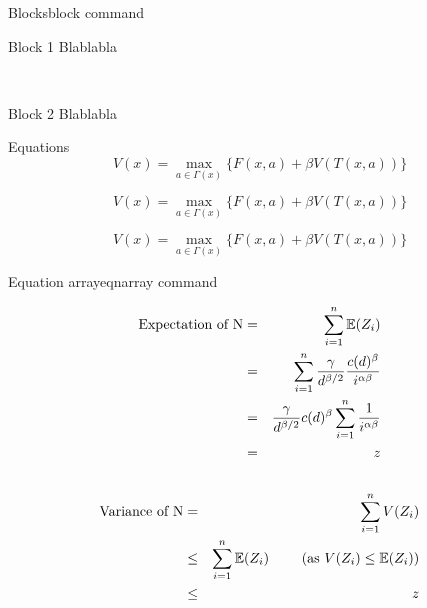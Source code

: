 \begin{frame}{Blocks}{block command}
    \begin{block}{Block 1}
        Blablabla
    \end{block}

    ~\\

    \begin{block}{Block 2}
        Blablabla
    \end{block}
\end{frame}
\note{
}


\begin{frame}{Equations}
    $$
        V(x) = \max_{a \in \Gamma (x) } \{ F(x,a) + \beta V(T(x,a)) \}  \label{eq:bellman}
    $$

    \[
        V(x) = \max_{a \in \Gamma (x) } \{ F(x,a) + \beta V(T(x,a)) \}  \label{eq:bellman}
    \]

    \begin{equation}
        V(x) = \max_{a \in \Gamma (x) } \{ F(x,a) + \beta V(T(x,a)) \}  \label{eq:bellman}
    \end{equation}
\end{frame}
\note{
}



\begin{frame}{Equation array}{eqnarray command}
    \begin{tiny}
        \begin{eqnarray*}
            \mbox{Expectation of N} & = & \sum_{i=1}^{n} \mathbb{E}(Z_i) \\
                                    & = & \sum_{i=1}^{n} \frac{\gamma}{d^{\beta/2}} \frac{ c(d)^\beta }{i^{\alpha\beta}} \\
                                    & = & \frac{\gamma}{d^{\beta/2}} c(d)^\beta \sum_{i=1}^{n} \frac{1}{i^{\alpha\beta}} \\
                                    & = & z \\
                                    & ~ & \\
        \end{eqnarray*}
        \begin{eqnarray}
            \mbox{Variance of N} & = & \sum_{i=1}^{n} V(Z_i) \\
                                 & \leq & \sum_{i=1}^{n} \mathbb{E}(Z_i) ~~~~~~~ (\mbox{as } V(Z_i) \leq \mathbb{E}(Z_i)) \\
                                 & \leq & z  \nonumber
        \end{eqnarray}
    \end{tiny}
\end{frame}
\note{
}


